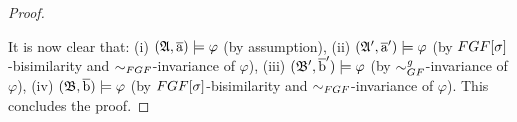 \begin{proof}
\begin{figure}[H]
  \label{fig:fgf-to-gf-upgrade}
\end{figure}

It is now clear that: 
(i) $({\mathfrak{A}}, \overline{\mathrm{a}}) \models \varphi$ (by assumption),
(ii) $({\mathfrak{A}}', \overline{\mathrm{a}}') \models \varphi$ (by $\FGF[\sigma]$-bisimilarity and $\bisimto_{\FGF}$-invariance of $\varphi$),
(iii) $({\mathfrak{B}}', \overline{\mathrm{b}}') \models \varphi$ (by $\bisimto_{\GF}^{\mathit{g}}$-invariance of $\varphi$),
(iv) $({\mathfrak{B}}, \overline{\mathrm{b}}) \models \varphi$ (by $\FGF[\sigma]$-bisimilarity and $\bisimto_{\FGF}$-invariance of $\varphi$). 
This concludes the proof.
\end{proof}




